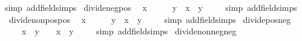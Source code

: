 \begin{isabellebody}
%
\isadelimproof
%
\endisadelimproof
%
\isatagproof
{}\isamarkupfalse%
{\isacharparenleft}{\kern0pt}simp\ add{\isacharcolon}{\kern0pt}field{\isacharunderscore}{\kern0pt}simps{\isacharparenright}{\kern0pt}%
\endisatagproof
{\isafoldproof}%
%
\isadelimproof
\isanewline
%
\endisadelimproof
\isanewline
{}\isamarkupfalse%
\ divide{\isacharunderscore}{\kern0pt}neg{\isacharunderscore}{\kern0pt}pos{\isacharcolon}{\kern0pt}\isanewline
\ \ {\isachardoublequoteopen}x\ {\isacharless}{\kern0pt}\ {}\ {\isasymLongrightarrow}\ {}\ {\isacharless}{\kern0pt}\ y\ {\isasymLongrightarrow}\ x\ {\isacharslash}{\kern0pt}\ y\ {\isacharless}{\kern0pt}\ {}{\isachardoublequoteclose}\isanewline
%
\isadelimproof
\ \ %
\endisadelimproof
%
\isatagproof
{}\isamarkupfalse%
{\isacharparenleft}{\kern0pt}simp\ add{\isacharcolon}{\kern0pt}field{\isacharunderscore}{\kern0pt}simps{\isacharparenright}{\kern0pt}%
\endisatagproof
{\isafoldproof}%
%
\isadelimproof
\isanewline
%
\endisadelimproof
\isanewline
{}\isamarkupfalse%
\ divide{\isacharunderscore}{\kern0pt}nonpos{\isacharunderscore}{\kern0pt}pos{\isacharcolon}{\kern0pt}\isanewline
\ \ {\isachardoublequoteopen}x\ {\isasymle}\ {}\ {\isasymLongrightarrow}\ {}\ {\isacharless}{\kern0pt}\ y\ {\isasymLongrightarrow}\ x\ {\isacharslash}{\kern0pt}\ y\ {\isasymle}\ {}{\isachardoublequoteclose}\isanewline
%
\isadelimproof
\ \ %
\endisadelimproof
%
\isatagproof
{}\isamarkupfalse%
{\isacharparenleft}{\kern0pt}simp\ add{\isacharcolon}{\kern0pt}field{\isacharunderscore}{\kern0pt}simps{\isacharparenright}{\kern0pt}%
\endisatagproof
{\isafoldproof}%
%
\isadelimproof
\isanewline
%
\endisadelimproof
\isanewline
{}\isamarkupfalse%
\ divide{\isacharunderscore}{\kern0pt}pos{\isacharunderscore}{\kern0pt}neg{\isacharcolon}{\kern0pt}\isanewline
\ \ {\isachardoublequoteopen}{}\ {\isacharless}{\kern0pt}\ x\ {\isasymLongrightarrow}\ y\ {\isacharless}{\kern0pt}\ {}\ {\isasymLongrightarrow}\ x\ {\isacharslash}{\kern0pt}\ y\ {\isacharless}{\kern0pt}\ {}{\isachardoublequoteclose}\isanewline
%
\isadelimproof
\ \ %
\endisadelimproof
%
\isatagproof
{}\isamarkupfalse%
{\isacharparenleft}{\kern0pt}simp\ add{\isacharcolon}{\kern0pt}field{\isacharunderscore}{\kern0pt}simps{\isacharparenright}{\kern0pt}%
\endisatagproof
{\isafoldproof}%
%
\isadelimproof
\isanewline
%
\endisadelimproof
\isanewline
{}\isamarkupfalse%
\ divide{\isacharunderscore}{\kern0pt}nonneg{\isacharunderscore}{\kern0pt}neg{\isacharcolon}{\kern0pt}\isanewline

\end{isabellebody}
